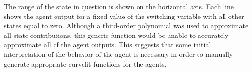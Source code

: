 The range of the state in question is shown on the horizontal axis. Each line shows the agent output for a fixed value of the switching variable with all other states equal to zero. Although a third-order polynomial was used to approximate all state contributions, this generic function would be unable to accurately approximate all of the agent outputs. This suggests that some initial interpretation of the behavior of the agent is necessary in order to manually generate appropriate curvefit functions for the agents.
%

